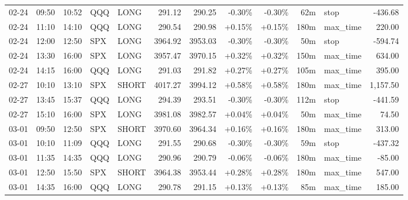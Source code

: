 \documentclass[11pt,a4paper]{article}
\begin{document}
\begin{center}
\begin{longtable}{>{\color{txtmain}}l l l l l r r r r r >{\color{txtmain}}l r}
02-24 & 09:50 & 10:52 & QQQ & LONG & 291.12 & 290.25 & \textcolor{lossred}{-0.30\%} & \textcolor{lossred}{-0.30\%} & 62m & stop & \textcolor{lossred}{-436.68} \\
02-24 & 11:10 & 14:10 & QQQ & LONG & 290.54 & 290.98 & \textcolor{wingreen}{+0.15\%} & \textcolor{wingreen}{+0.15\%} & 180m & max\_time & \textcolor{wingreen}{220.00} \\
02-24 & 12:00 & 12:50 & SPX & LONG & 3964.92 & 3953.03 & \textcolor{lossred}{-0.30\%} & \textcolor{lossred}{-0.30\%} & 50m & stop & \textcolor{lossred}{-594.74} \\
02-24 & 13:30 & 16:00 & SPX & LONG & 3957.47 & 3970.15 & \textcolor{wingreen}{+0.32\%} & \textcolor{wingreen}{+0.32\%} & 150m & max\_time & \textcolor{wingreen}{634.00} \\
02-24 & 14:15 & 16:00 & QQQ & LONG & 291.03 & 291.82 & \textcolor{wingreen}{+0.27\%} & \textcolor{wingreen}{+0.27\%} & 105m & max\_time & \textcolor{wingreen}{395.00} \\
02-27 & 10:10 & 13:10 & SPX & SHORT & 4017.27 & 3994.12 & \textcolor{wingreen}{+0.58\%} & \textcolor{wingreen}{+0.58\%} & 180m & max\_time & \textcolor{wingreen}{1,157.50} \\
02-27 & 13:45 & 15:37 & QQQ & LONG & 294.39 & 293.51 & \textcolor{lossred}{-0.30\%} & \textcolor{lossred}{-0.30\%} & 112m & stop & \textcolor{lossred}{-441.59} \\
02-27 & 15:10 & 16:00 & SPX & LONG & 3981.08 & 3982.57 & \textcolor{wingreen}{+0.04\%} & \textcolor{wingreen}{+0.04\%} & 50m & max\_time & \textcolor{wingreen}{74.50} \\
03-01 & 09:50 & 12:50 & SPX & SHORT & 3970.60 & 3964.34 & \textcolor{wingreen}{+0.16\%} & \textcolor{wingreen}{+0.16\%} & 180m & max\_time & \textcolor{wingreen}{313.00} \\
03-01 & 10:10 & 11:09 & QQQ & LONG & 291.55 & 290.68 & \textcolor{lossred}{-0.30\%} & \textcolor{lossred}{-0.30\%} & 59m & stop & \textcolor{lossred}{-437.32} \\
03-01 & 11:35 & 14:35 & QQQ & LONG & 290.96 & 290.79 & \textcolor{lossred}{-0.06\%} & \textcolor{lossred}{-0.06\%} & 180m & max\_time & \textcolor{lossred}{-85.00} \\
03-01 & 12:50 & 15:50 & SPX & SHORT & 3964.38 & 3953.44 & \textcolor{wingreen}{+0.28\%} & \textcolor{wingreen}{+0.28\%} & 180m & max\_time & \textcolor{wingreen}{547.00} \\
03-01 & 14:35 & 16:00 & QQQ & LONG & 290.78 & 291.15 & \textcolor{wingreen}{+0.13\%} & \textcolor{wingreen}{+0.13\%} & 85m & max\_time & \textcolor{wingreen}{185.00} \\

\end{longtable}
\end{center}
\end{document}
